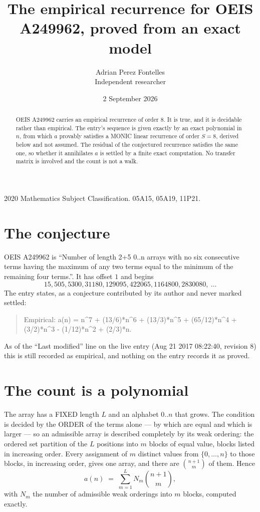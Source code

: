 \documentclass[11pt,a4paper]{article}
\title{The empirical recurrence for OEIS A249962, proved from an exact model}
\author{Adrian Perez Fontelles\\ \small Independent researcher}
\date{2 September 2026}
\theoremstyle{plain}
\theoremstyle{definition}
\begin{document}
\maketitle

\begin{abstract}
OEIS A249962 carries an empirical recurrence of order $8$. It is true, and it is
decidable rather than empirical. The entry's sequence is given exactly by an exact polynomial in $n$, from
which $a$ provably satisfies a MONIC linear recurrence of order $S=8$, derived below and not
assumed. The residual of the conjectured recurrence satisfies the same one, so whether it
annihilates $a$ is settled by a finite exact computation. No transfer matrix is involved and
the count is not a walk.
\end{abstract}

\noindent\small 2020 Mathematics Subject Classification. 05A15, 05A19, 11P21.\normalsize

\section{The conjecture}

OEIS A249962 is ``Number of length 2+5 0..n arrays with no six consecutive terms having the maximum of any two terms equal to the minimum of the remaining four terms.''. It has offset $1$ and begins
\[
15, 505, 5300, 31180, 129095, 422065, 1164800, 2830080,\ \dots
\]
The entry states, as a conjecture contributed by its author and never marked settled:
\begin{quote}
Empirical: a(n) = n\^{}7 + (13/6)*n\^{}6 + (13/3)*n\^{}5 + (65/12)*n\^{}4 + (3/2)*n\^{}3 - (1/12)*n\^{}2 + (2/3)*n.
\end{quote}
As of the ``Last modified'' line on the live entry (Aug 21 2017 08:22:40, revision 8)
this is still recorded as empirical, and nothing on the entry records it as proved.

\section{The count is a polynomial}

The array has a FIXED length $L$ and an alphabet $0..n$ that grows. The condition is decided by
the ORDER of the terms alone --- by which are equal and which is larger --- so an admissible
array is described completely by its weak ordering: the ordered set partition of the $L$
positions into $m$ blocks of equal value, blocks listed in increasing order. Every assignment
of $m$ distinct values from $\{0,\dots,n\}$ to those blocks, in increasing order, gives one
array, and there are $\binom{n+1}{m}$ of them. Hence
\[
a(n)\;=\;\sum_{m=1}^{L} N_m\binom{n+1}{m},
\]
with $N_m$ the number of admissible weak orderings into $m$ blocks, computed exactly.
\end{document}
